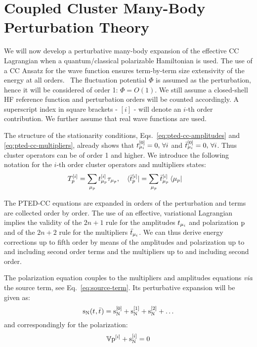 \section[Coupled Cluster Many-Body Perturbation Theory]{
Coupled Cluster Many-Body Perturbation Theory}\label{sec:mbpt-polarizable}

We will now develop a perturbative many-body expansion of the effective
\acs{CC} Lagrangian when a quantum/classical polarizable Hamiltonian is
used.
The use of a \acs{CC} Ansatz for the wave function ensures term-by-term
size extensivity of the energy at all orders.~\autocite{Helgaker2000-tz}
The fluctuation potential $\Phi$ is assumed as the perturbation, hence
it will be considered of order 1: $\Phi = O(1)$.
We still assume a closed-shell \acs{HF} reference function and
perturbation orders will be counted accordingly.
A superscript index in square brackets - $[i]$ -  will denote an $i$-th
order contribution.
We further assume that real wave functions are used.

The structure of the stationarity conditions,
Eqs.~\eqref{eq:pted-cc-amplitudes} and \eqref{eq:pted-cc-multipliers},
already shows that $t_{\mu_i}^{[0]} = 0, \,\forall i$ and
$\bar{t}_{\mu_i}^{[0]} = 0, \, \forall i$.
Thus cluster operators can be of order 1 and higher. We introduce the
following notation for the $i$-th order cluster operators and
multipliers states:
\begin{alignat}{2}
  T_p^{[i]} = \sum_{\mu_p}t_{\mu_p}^{[i]}\tau_{\mu_p},
  \quad&
  \bra{\bar{t}_{p}^{[i]}} = \sum_{\mu_p}\bar{t}_{\mu_p}^{[i]}\bra{\mu_p}
\end{alignat}

The \acs{PTED}-\acs{CC} equations are expanded in orders of the
perturbation and terms are collected order by order. The use of an
effective, variational Lagrangian implies the validity of the $2n+1$
rule for the amplitudes $t_{\mu_i}$ and polarization $\mathrm{p}$ and of the
$2n+2$ rule for the multipliers $\bar{t}_{\mu_i}$.
We can thus derive energy corrections up to fifth order by means of the
amplitudes and polarization up to and including second order terms and
the multipliers up to and including second order.

The polarization equation couples to the multipliers and amplitudes
equations \emph{via} the source term, see Eq.~\eqref{eq:source-term}.
Its perturbative expansion will be given as:
\begin{equation}\label{eq:source-term-pt}
  \mathrm{s}_{\mathrm{N}}(t_{},\bar{t}_{}) =
  \mathrm{s}_{\mathrm{N}}^{[0]}
  + \mathrm{s}_{\mathrm{N}}^{[1]}
  + \mathrm{s}_{\mathrm{N}}^{[2]}
  + \ldots
\end{equation}
and correspondingly for the polarization:
\begin{equation}\label{eq:pol-eq-pt}
  \mathbb{V}\mathrm{p}^{[i]} + \mathrm{s}_{\mathrm{N}}^{[i]} = 0
\end{equation}

